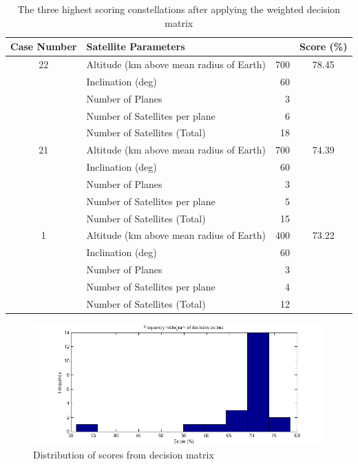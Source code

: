 \begin{table}[htbp]
  \centering
  \caption{The three highest scoring constellations after applying the weighted decision matrix}
    \begin{tabular}{rlrr}
    \toprule
    Case Number & Satellite Parameters &       & Score (\%) \\
    \midrule
    \multicolumn{1}{c}{\multirow{1}[10]{*}{22}} & Altitude (km above mean radius of Earth) & 700   & \multicolumn{1}{c}{\multirow{1}[10]{*}{78.45}} \\
    \multicolumn{1}{c}{} & Inclination (deg) & 60    & \multicolumn{1}{c}{} \\
    \multicolumn{1}{c}{} & Number of Planes & 3     & \multicolumn{1}{c}{} \\
    \multicolumn{1}{c}{} & Number of Satellites per plane & 6     & \multicolumn{1}{c}{} \\
    \multicolumn{1}{c}{} & Number of Satellites (Total) & 18    & \multicolumn{1}{c}{} \\ \hline
    \multicolumn{1}{c}{\multirow{1}[10]{*}{21}} & Altitude (km above mean radius of Earth) & 700   & \multicolumn{1}{c}{\multirow{1}[10]{*}{74.39}} \\
    \multicolumn{1}{c}{} & Inclination (deg) & 60    & \multicolumn{1}{c}{} \\
    \multicolumn{1}{c}{} & Number of Planes & 3     & \multicolumn{1}{c}{} \\
    \multicolumn{1}{c}{} & Number of Satellites per plane & 5     & \multicolumn{1}{c}{} \\
    \multicolumn{1}{c}{} & Number of Satellites (Total) & 15    & \multicolumn{1}{c}{} \\ \hline
    \multicolumn{1}{c}{\multirow{1}[10]{*}{1}} & Altitude (km above mean radius of Earth) & 400   & \multicolumn{1}{c}{\multirow{1}[10]{*}{73.22}} \\
    \multicolumn{1}{c}{} & Inclination (deg) & 60    & \multicolumn{1}{c}{} \\
    \multicolumn{1}{c}{} & Number of Planes & 3     & \multicolumn{1}{c}{} \\
    \multicolumn{1}{c}{} & Number of Satellites per plane & 4     & \multicolumn{1}{c}{} \\
    \multicolumn{1}{c}{} & Number of Satellites (Total) & 12    & \multicolumn{1}{c}{} \\
    \bottomrule
    \end{tabular}%
  \label{tab:decMatRes}%
\end{table}%

\begin{figure}[H]
	\centering
	\includegraphics[scale = 0.6]{Pictures/decisionMatrixHist.png}
	
	\caption{Distribution of scores from decision matrix}
	\label{fig:decisionMatrixHist}
\end{figure}

